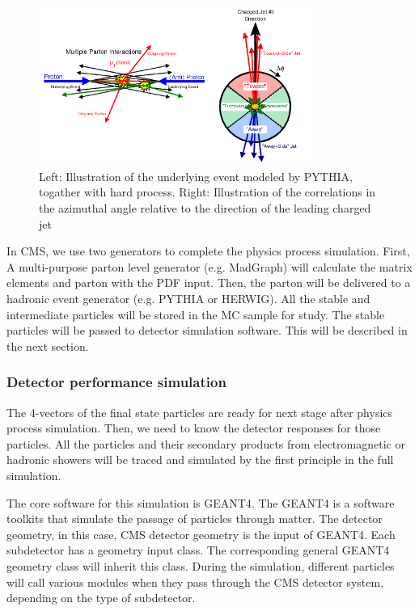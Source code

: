 \begin{figure}[htbp]
 \begin{center}
  \includegraphics[width=0.8\textwidth]{figures/c3/c3_cms_underlyingevents.png}
 \end{center}
 \caption{Left: Illustration of the underlying event modeled by PYTHIA, togather with hard process. Right: Illustration of the correlations in the azimuthal angle relative to the direction of the leading charged jet}
 \label{fig:c3cmsunderlyingevents}
\end{figure}

In CMS, we use two generators to complete the physics process simulation. First, A multi-purpose parton level generator (e.g. MadGraph\cite{Alwall:2011uj}) will calculate the matrix elements and parton with the PDF input. Then, the parton will be delivered to a hadronic event generator (e.g. PYTHIA\cite{Sjostrand:2014zea} or HERWIG\cite{Bellm:2015jjp}). All the stable and intermediate particles will be stored in the MC sample for study. The stable particles will be passed to detector simulation software. This will be described in the next section. 

\subsubsection{Detector performance simulation}

The 4-vectors of the final state particles are ready for next stage after physics process simulation. Then, we need to know the detector responses for those particles. All the particles and their secondary products from electromagnetic or hadronic showers will be traced and simulated by the first principle in the full simulation. 

The core software for this simulation is GEANT4\cite{Agostinelli:2002hh}. The GEANT4 is a software toolkits that simulate the passage of particles through matter. The detector geometry, in this case, CMS detector geometry\cite{Lefebure:1999wja} is the input of GEANT4. Each subdetector has a geometry input class. The corresponding general GEANT4 geometry class will inherit this class. During the simulation, different particles will call various modules when they pass through the CMS detector system, depending on the type of subdetector. 

